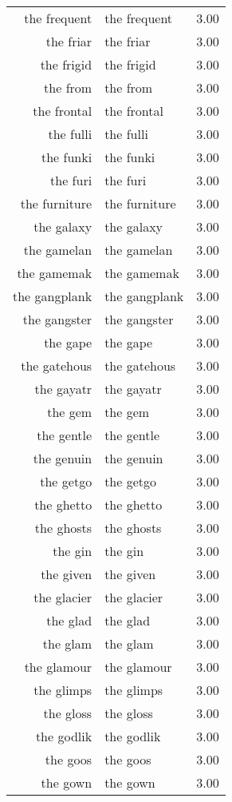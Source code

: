 \begin{table}[ht]
\begin{tabular}{rlr}
  the frequent & the frequent & 3.00 \\ 
  the friar & the friar & 3.00 \\ 
  the frigid & the frigid & 3.00 \\ 
  the from & the from & 3.00 \\ 
  the frontal & the frontal & 3.00 \\ 
  the fulli & the fulli & 3.00 \\ 
  the funki & the funki & 3.00 \\ 
  the furi & the furi & 3.00 \\ 
  the furniture & the furniture & 3.00 \\ 
  the galaxy & the galaxy & 3.00 \\ 
  the gamelan & the gamelan & 3.00 \\ 
  the gamemak & the gamemak & 3.00 \\ 
  the gangplank & the gangplank & 3.00 \\ 
  the gangster & the gangster & 3.00 \\ 
  the gape & the gape & 3.00 \\ 
  the gatehous & the gatehous & 3.00 \\ 
  the gayatr & the gayatr & 3.00 \\ 
  the gem & the gem & 3.00 \\ 
  the gentle & the gentle & 3.00 \\ 
  the genuin & the genuin & 3.00 \\ 
  the getgo & the getgo & 3.00 \\ 
  the ghetto & the ghetto & 3.00 \\ 
  the ghosts & the ghosts & 3.00 \\ 
  the gin & the gin & 3.00 \\ 
  the given & the given & 3.00 \\ 
  the glacier & the glacier & 3.00 \\ 
  the glad & the glad & 3.00 \\ 
  the glam & the glam & 3.00 \\ 
  the glamour & the glamour & 3.00 \\ 
  the glimps & the glimps & 3.00 \\ 
  the gloss & the gloss & 3.00 \\ 
  the godlik & the godlik & 3.00 \\ 
  the goos & the goos & 3.00 \\ 
  the gown & the gown & 3.00 \\ 

\end{tabular}
\end{table}
